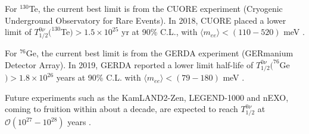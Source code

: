 For $^{130}$Te, the current best limit is from the CUORE experiment (Cryogenic Underground Observatory for Rare Events). In 2018, CUORE placed a lower limit of $T^{0\nu}_{1/2}(^{130}$Te$)>1.5\times 10^{25}$ yr at 90\% C.L., with $\langle m_{ee}\rangle<(110-520)$ meV \cite{alduino2018first}.

For $^{76}$Ge, the current best limit is from the GERDA experiment (GERmanium Detector Array). In 2019, GERDA reported a lower limit half-life of $T^{0\nu}_{1/2}(^{76}$Ge$)>1.8\times 10^{26}$ years at 90\% C.L. with $\langle m_{ee}\rangle<(79-180)$ meV \cite{agostini2020final}.

Future experiments such as the KamLAND2-Zen, LEGEND-1000 and nEXO, coming to fruition within about a decade, are expected to reach $T^{0\nu}_{1/2}$ at $\mathcal{O}(10^{27}-10^{28})$ years \cite{dolinski2019neutrinoless}.


